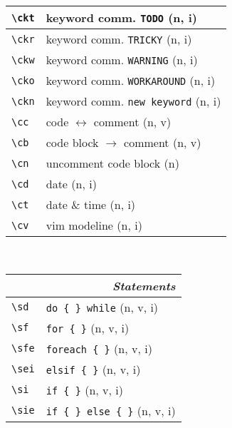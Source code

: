 \documentclass[oneside,10pt,landscape,DIV16]{scrartcl}
\begin{document}
\begin{multicols}{3}
\begin{center}
\begin{tabular}[]{|p{11mm}|p{58mm}|}
\hline \verb'\ckt' & keyword comm. \verb'TODO'         \hfill (n, i)  \\
\hline \verb'\ckr' & keyword comm. \verb'TRICKY'       \hfill (n, i)  \\
\hline \verb'\ckw' & keyword comm. \verb'WARNING'      \hfill (n, i)  \\
\hline \verb'\cko' & keyword comm. \verb'WORKAROUND'   \hfill (n, i)  \\
\hline \verb'\ckn' & keyword comm. \verb'new keyword'  \hfill (n, i)  \\
\hline \verb'\cc'  & code $\leftrightarrow$ comment    \hfill (n, v)  \\
\hline \verb'\cb'  & code block $\rightarrow$ comment  \hfill (n, v)  \\
\hline \verb'\cn'  & uncomment code block              \hfill (n)    \\
\hline \verb'\cd'  & date                              \hfill (n, i)  \\
\hline \verb'\ct'  & date \& time                      \hfill (n, i)  \\
\hline \verb'\cv'  & vim modeline                      \hfill (n, i)  \\
\hline
\end{tabular}\\
%
%
\begin{tabular}[]{|p{11mm}|p{58mm}|}
\hline
\multicolumn{2}{|r|}{\textsl{\textbf{S}tatements}} \\
\hline \verb'\sd'  & \verb'do { } while'               \hfill (n, v, i)\\
\hline \verb'\sf'  & \verb'for { }'                    \hfill (n, v, i)\\
\hline \verb'\sfe' & \verb'foreach { }'                \hfill (n, v, i)\\
\hline \verb'\sei' & \verb'elsif { }'                  \hfill (n, v, i)\\
\hline \verb'\si'  & \verb'if { }'                     \hfill (n, v, i)\\
\hline \verb'\sie' & \verb'if { } else { }'            \hfill (n, v, i)\\

\end{tabular}
\end{center}
\end{multicols}
\end{document}
